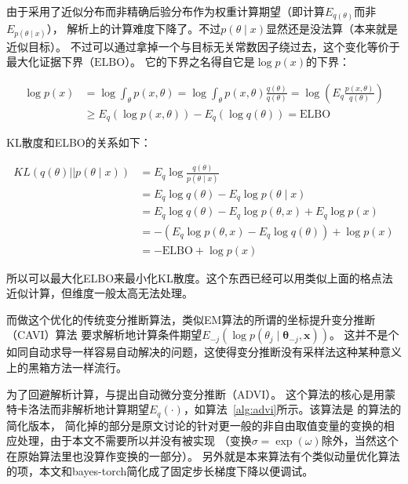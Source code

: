 \documentclass{sicnuthesis}
\begin{document}
由于采用了近似分布而非精确后验分布作为权重计算期望（即计算$E_{q(\theta)}$而非$E_{p(\theta \mid x)}$），
解析上的计算难度下降了。不过$p(\theta \mid x)$显然还是没法算（本来就是近似目标）。
不过可以通过拿掉一个与目标无关常数因子绕过去，这个变化等价于最大化证据下界（$\mathrm{ELBO}$）。
它的下界之名得自它是$\log p(x)$的下界：

\begin{align*}
\log p(x) &= \log \int_\theta p(x,\theta) = \log \int_\theta p(x,\theta) \frac{q(\theta)}{q(\theta)} = \log \left( E_q \frac{p(x,\theta)}{q(\theta)} \right)  \\
          &\ge E_q (\log p(x,\theta)) - E_q(\log q(\theta)) = \mathrm{ELBO}
\end{align*}


KL散度和ELBO的关系如下：

\begin{align*}
KL(q(\theta) || p(\theta \mid x)) &= E_q \log \frac{q(\theta)}{p(\theta \mid x)}  \\
                                  &= E_q \log q(\theta) - E_q \log p(\theta \mid x) \\
                                  &= E_q \log q(\theta) - E_q \log p(\theta,x) + E_q \log p(x) \\
                                  &= -(E_q \log p(\theta,x) -E_q \log q(\theta)) + \log p(x) \\
                                  &= -\mathrm{ELBO} + \log p(x)
\end{align*}


所以可以最大化ELBO来最小化KL散度。这个东西已经可以用类似上面的格点法近似计算，但维度一般太高无法处理。

而做这个优化的传统变分推断算法，类似EM算法的所谓的坐标提升变分推断（CAVI）算法
要求解析地计算条件期望$E_{-j}(\log p(\theta_j \mid \mathbf{\theta}_{-j},\mathbf{x}))$。
这并不是个如同自动求导一样容易自动解决的问题，这使得变分推断没有采样法这种某种意义上的黑箱方法一样流行。

为了回避解析计算，\cite{kucukelbir2017automatic}与\cite{kucukelbir2014fully}提出自动微分变分推断（ADVI）。
这个算法的核心是用蒙特卡洛法而非解析地计算期望$E_q(\cdot)$，如算法~\ref{alg:advi}所示。该算法是
\cite{kucukelbir2017automatic}的算法的简化版本，
简化掉的部分是原文讨论的针对更一般的非自由取值变量的变换的相应处理，由于本文不需要所以并没有被实现
（变换$\sigma=\exp(\omega)$除外，当然这个在原始算法里也没算作变换的一部分）。
另外就是本来算法有个类似动量优化算法的项，本文和bayes-torch简化成了固定步长梯度下降以便调试。
\end{document}
